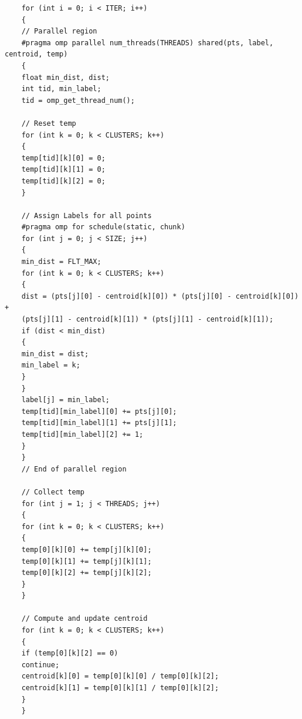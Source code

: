 \documentclass[11pt,a4paper,oneside]{article}
\begin{document}
    \begin{verbatim}
    for (int i = 0; i < ITER; i++)
    {	
    // Parallel region
    #pragma omp parallel num_threads(THREADS) shared(pts, label, centroid, temp)
    {	
    float min_dist, dist;
    int tid, min_label;
    tid = omp_get_thread_num();
    
    // Reset temp
    for (int k = 0; k < CLUSTERS; k++)
    {
    temp[tid][k][0] = 0;
    temp[tid][k][1] = 0;
    temp[tid][k][2] = 0;
    }
    
    // Assign Labels for all points
    #pragma omp for schedule(static, chunk)
    for (int j = 0; j < SIZE; j++)
    {
    min_dist = FLT_MAX;                
    for (int k = 0; k < CLUSTERS; k++)
    {
    dist = (pts[j][0] - centroid[k][0]) * (pts[j][0] - centroid[k][0]) +
    (pts[j][1] - centroid[k][1]) * (pts[j][1] - centroid[k][1]);
    if (dist < min_dist)
    {
    min_dist = dist;
    min_label = k;
    }
    }
    label[j] = min_label;
    temp[tid][min_label][0] += pts[j][0];
    temp[tid][min_label][1] += pts[j][1];
    temp[tid][min_label][2] += 1; 
    }
    }
    // End of parallel region
    
    // Collect temp
    for (int j = 1; j < THREADS; j++)
    {
    for (int k = 0; k < CLUSTERS; k++)
    {
    temp[0][k][0] += temp[j][k][0];
    temp[0][k][1] += temp[j][k][1];
    temp[0][k][2] += temp[j][k][2];
    }
    }
    
    // Compute and update centroid
    for (int k = 0; k < CLUSTERS; k++)
    {
    if (temp[0][k][2] == 0)
    continue;
    centroid[k][0] = temp[0][k][0] / temp[0][k][2];
    centroid[k][1] = temp[0][k][1] / temp[0][k][2];
    }
    }
    \end{verbatim}
    
\end{document}
